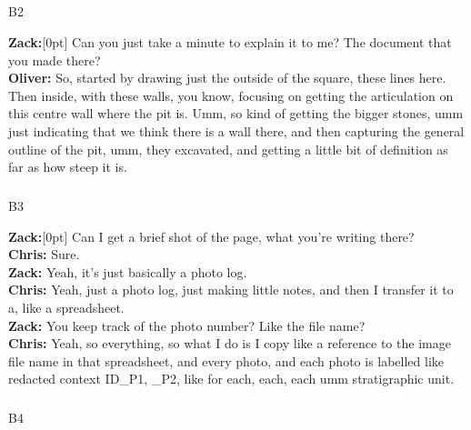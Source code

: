 \documentclass[
]{article}
\makeatletter
\let\oldsubparagraph\subparagraph
\renewcommand{\subparagraph}{
    \@ifstar
      \xxxSubParagraphStar
      \xxxSubParagraphNoStar
  }
\newcommand{\xxxSubParagraphStar}[1]{\oldsubparagraph*{#1}\mbox{}}
\newcommand{\xxxSubParagraphNoStar}[1]{\oldsubparagraph{#1}\mbox{}}
\newcommand{\paragraphnumber}[1]{\marginnote{\color{lightgray}\tiny{#1}}[0pt]}
\makeatother
\begin{document}
\subparagraph{B2}\label{sec-B2}

\textbf{Zack:}\paragraphnumber{[116]} Can you just take a minute to
explain it to me? The document that you made there?\\
\textbf{Oliver:} So, started by drawing just the outside of the square,
these lines here. Then inside, with these walls, you know, focusing on
getting the articulation on this centre wall where the pit is. Umm, so
kind of getting the bigger stones, umm just indicating that we think
there is a wall there, and then capturing the general outline of the
pit, umm, they excavated, and getting a little bit of definition as far
as how steep it is.

\subparagraph{B3}\label{sec-B3}

\textbf{Zack:}\paragraphnumber{[117]} Can I get a brief shot of the
page, what you're writing there?\\
\textbf{Chris:} Sure.\\
\textbf{Zack:} Yeah, it's just basically a photo log.\\
\textbf{Chris:} Yeah, just a photo log, just making little notes, and
then I transfer it to a, like a spreadsheet.\\
\textbf{Zack:} You keep track of the photo number? Like the file name?\\
\textbf{Chris:} Yeah, so everything, so what I do is I copy like a
reference to the image file name in that spreadsheet, and every photo,
and each photo is labelled like redacted context ID\_P1, \_P2, like for
each, each, each umm stratigraphic unit.

\subparagraph{B4}\label{sec-B4}
\end{document}
